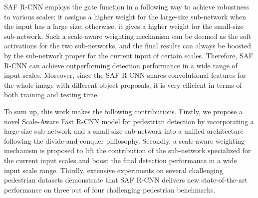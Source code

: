 \documentclass[journal]{IEEEtran}
\begin{document}
SAF R-CNN employs the gate function in a following way to achieve robustness to various scales: it assigns a higher weight for the large-size sub-network when the input has a large size; otherwise, it gives a higher weight  for the small-size sub-network. Such a scale-aware weighting mechanism can be deemed as the soft activations for the two sub-networks, and the final results can always be boosted by the sub-network proper for the current input of certain scales. Therefore, SAF R-CNN can achieve outperforming detection performance in a wide range of input scales. Moreover, since the SAF R-CNN shares convolutional features for the whole image with different object proposals, it is very efficient in terms of both training and testing time.

To sum up, this work makes the following contributions. Firstly, we propose a novel Scale-Aware Fast R-CNN model for pedestrian detection by incorporating a large-size sub-network and a small-size sub-network into a unified architecture following the divide-and-conquer philosophy. Secondly, a scale-aware weighting mechanism is proposed to lift the contribution of the sub-network specialized for the current input scales and boost the final detection performance in a wide input scale range. Thirdly, extensive experiments on several challenging pedestrian datasets demonstrate that SAF R-CNN delivers new state-of-the-art performance on three out of four challenging pedestrian benchmarks.
\end{document}
